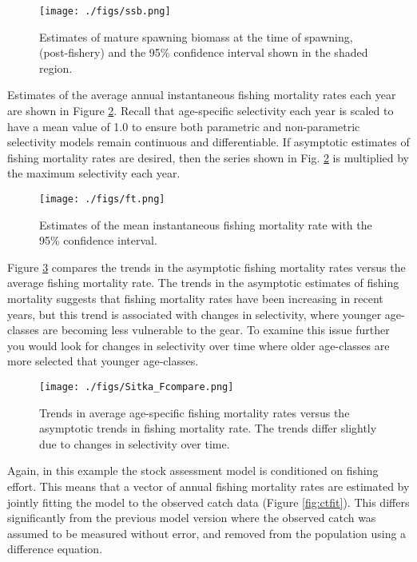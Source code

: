 \documentclass[12pt,letterpaper]{article}
\begin{document}
  
  \begin{figure}[tb]
    \centering
    \texttt{[image: ./figs/ssb.png]}
    \caption{Estimates of mature spawning biomass at the time of spawning, (post-fishery) and the 95\% confidence interval shown in the shaded region.}
    \label{fig:ssb}
  \end{figure}

  Estimates of the average annual instantaneous fishing mortality rates each year are shown in Figure \ref{fig:ft}.  Recall that age-specific selectivity each year is scaled to have a mean value of 1.0 to ensure both parametric and non-parametric selectivity models remain continuous and differentiable.  If asymptotic estimates of fishing mortality rates are desired, then the series shown in Fig. \ref{fig:ft} is multiplied by the maximum selectivity each year.  

  \begin{figure}[tb]
    \centering
    \texttt{[image: ./figs/ft.png]}
    \caption{Estimates of the mean instantaneous fishing mortality rate with the 95\% confidence interval.}
    \label{fig:ft}
  \end{figure}

  Figure \ref{fig:Fcompare} compares the trends in the asymptotic fishing mortality rates versus the average fishing mortality rate.  The trends in the asymptotic estimates of fishing mortality suggests that fishing mortality rates have been increasing in recent years, but this trend is associated with changes in selectivity, where younger age-classes are becoming less vulnerable to the gear.  To examine this issue further you would look for changes in selectivity over time where older age-classes are more selected that younger age-classes.  

  \begin{figure}[tb]
    \centering
    \texttt{[image: ./figs/Sitka\_Fcompare.png]}
    \caption{Trends in average age-specific fishing mortality rates versus the asymptotic trends in fishing mortality rate. The trends differ slightly due to changes in selectivity over time.}
    \label{fig:Fcompare}
  \end{figure}

  Again, in this example the stock assessment model is conditioned on fishing effort. This means that a vector of annual fishing mortality rates are estimated by jointly fitting the model to the observed catch data (Figure \ref{fig:ctfit}).  This differs significantly from the previous model version where the observed catch was assumed to be measured without error, and removed from the population using a difference equation. 
\end{document}
